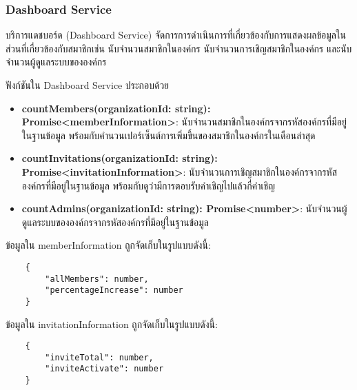 \subsubsection{Dashboard Service}
\ifenglish
\else
บริการแดชบอร์ด (Dashboard Service) จัดการการดำเนินการที่เกี่ยวข้องกับการแสดงผลข้อมูลในส่วนที่เกี่ยวข้องกับสมาชิกเช่น นับจำนวนสมาชิกในองค์กร นับจำนวนการเชิญสมาชิกในองค์กร และนับจำนวนผู้ดูแลระบบขององค์กร

ฟังก์ชันใน Dashboard Service ประกอบด้วย

\begin{itemize}
    \item \textbf{countMembers(organizationId: string): Promise<memberInformation>}: นับจำนวนสมาชิกในองค์กรจากรหัสองค์กรที่มีอยู่ในฐานข้อมูล พร้อมกับคำนวนเปอร์เซ็นต์การเพิ่มขึ้นของสมาชิกในองค์กรในเดือนล่าสุด
    \item \textbf{countInvitations(organizationId: string): Promise<invitationInformation>}: นับจำนวนการเชิญสมาชิกในองค์กรจากรหัสองค์กรที่มีอยู่ในฐานข้อมูล พร้อมกับดูว่ามีการตอบรับคำเชิญไปแล้วกี่คำเชิญ
    \item \textbf{countAdmins(organizationId: string): Promise<number>}: นับจำนวนผู้ดูแลระบบขององค์กรจากรหัสองค์กรที่มีอยู่ในฐานข้อมูล
\end{itemize}

ข้อมูลใน memberInformation ถูกจัดเก็บในรูปแบบดังนี้:
\begin{lstlisting}
    {
        "allMembers": number,
        "percentageIncrease": number
    }
\end{lstlisting}

ข้อมูลใน invitationInformation ถูกจัดเก็บในรูปแบบดังนี้:
\begin{lstlisting}
    {
        "inviteTotal": number,
        "inviteActivate": number
    }
\end{lstlisting}
\fi